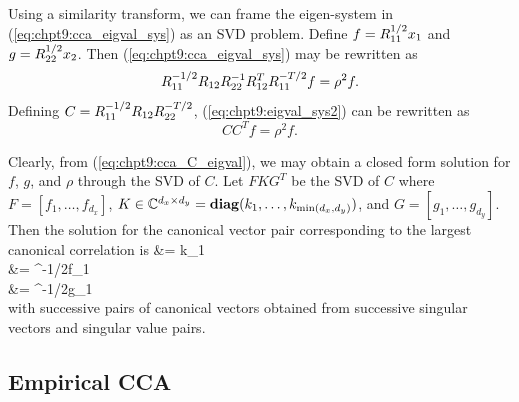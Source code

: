  Using a similarity transform, we can frame the eigen-system in (\ref{eq:chpt9:cca_eigval_sys})
 as an SVD problem. Define $f = R_{11}^{1/2}x_1$ and $g=R_{22}^{1/2}x_2$. Then
 (\ref{eq:chpt9:cca_eigval_sys}) may be rewritten as
\begin{equation}\label{eq:chpt9:eigval_sys2}
  \RI^{-1/2}\RIII\RII^{-1}\RIII^T\RI^{-T/2}f = \rho^2f.
\end{equation}
Defining $C=R_{11}^{-1/2}R_{12}R_{22}^{-T/2}$, (\ref{eq:chpt9:eigval_sys2}) can be rewritten as
\begin{equation}\label{eq:chpt9:cca_C_eigval}
  CC^Tf=\rho^2f.
\end{equation}

Clearly, from (\ref{eq:chpt9:cca_C_eigval}), we may obtain a closed form solution for $f$, $g$, and
$\rho$ through the SVD of $C$. Let $FKG^T$ be the SVD of $C$ where
$F=[f_1,\dots,f_{d_x}]$, $K\in\mathbb{C}^{d_x\times
  d_y}=\mathop{\bf diag}(k_1,\dots,k_{\min\left(d_x,d_y\right)})$, and $G=[g_1,\dots,g_{d_y}]$. Then the solution
for the canonical vector pair corresponding to the largest canonical correlation is
\beq\label{eq:chpt9:cca_svd_sol}\ba
&\rho = k_1\\
&\xI = \RI^{-1/2}f_1\\
&\xII = \RII^{-1/2}g_1\\
\ea\eeq
with successive pairs of canonical vectors obtained from successive singular vectors and
singular value pairs.

\subsection{Empirical CCA}\label{sec:emp_cca}

